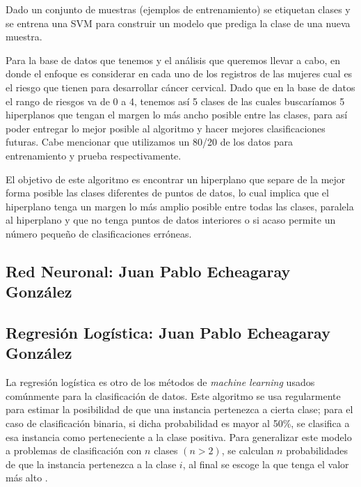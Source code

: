 \documentclass[journal]{IEEEtran}                                                          %
\begin{document}
            Dado un conjunto de muestras (ejemplos de entrenamiento) se etiquetan clases y se entrena una SVM para construir un modelo que prediga la clase de una nueva muestra.

            Para la base de datos que tenemos y el análisis que queremos llevar a cabo, en donde el enfoque es considerar en cada uno de los registros de las mujeres cual es el riesgo que tienen para desarrollar cáncer cervical. Dado que en la base de datos el rango de riesgos va de 0 a 4, tenemos así 5 clases de las cuales buscaríamos 5 hiperplanos que tengan el margen lo más ancho posible entre las clases, para así poder entregar lo mejor posible al algoritmo y hacer mejores clasificaciones futuras. Cabe mencionar que utilizamos un 80/20 de los datos para entrenamiento y prueba respectivamente.

            El objetivo de este algoritmo es encontrar un hiperplano que separe de la mejor forma posible las clases diferentes de puntos de datos, lo cual implica que el hiperplano tenga un margen lo más amplio posible entre todas las clases, paralela al hiperplano y que no tenga puntos de datos interiores o si acaso permite un número pequeño de clasificaciones erróneas.

        \subsection{Red Neuronal: Juan Pablo Echeagaray González} \label{neural-network}
           


        \subsection{Regresión Logística: Juan Pablo Echeagaray González} \label{logistic}

            La regresión logística es otro de los métodos de \emph{machine learning} usados comúnmente para la clasificación de datos. Este algoritmo se usa regularmente para estimar la posibilidad de que una instancia pertenezca a cierta clase; para el caso de clasificación binaria, si dicha probabilidad es mayor al 50\%, se clasifica a esa instancia como perteneciente a la clase positiva. Para generalizar este modelo a problemas de clasificación con $n$ clases $(n > 2)$, se calculan $n$ probabilidades de que la instancia pertenezca a la clase $i$, al final se escoge la que tenga el valor más alto \cite{geron-2019} \cite{sci-kit-learn-no-dateB}.
\end{document}
